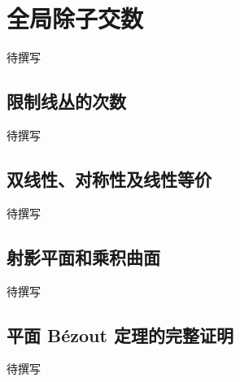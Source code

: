 
% 
% 

\section{全局除子交数}
\label{g5:sec:2502}

待撰写

\subsection{限制线丛的次数}
\label{g5:subsec:2502:01}
待撰写

\subsection{双线性、对称性及线性等价}
\label{g5:subsec:2502:02}
待撰写

\subsection{射影平面和乘积曲面}
\label{g5:subsec:2502:03}
待撰写

\subsection{平面 Bézout 定理的完整证明}
\label{g5:subsec:2502:04}
待撰写
